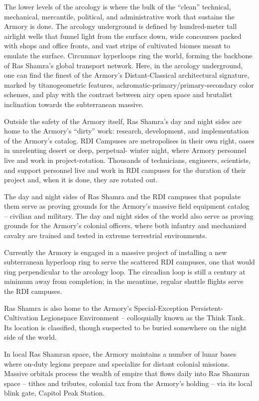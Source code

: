 The lower levels of the arcology is where the bulk of the ``clean'' technical, mechanical, mercantile,
political, and administrative work that sustains the Armory is done. The arcology underground is
defined by hundred-meter tall airlight wells that funnel light from the surface down, wide
concourses packed with shops and office fronts, and vast strips of cultivated biomes meant to
emulate the surface. Circumnav hyperloops ring the world, forming the backbone of Ras
Shamra's global transport network. Here, in the arcology underground, one can find the finest of
the Armory's Distant-Classical architectural signature, marked by titanogeometric features,
achromatic-primary/primary-secondary color schemes, and play with the contrast between airy
open space and brutalist inclination towards the subterranean massive.

Outside the safety of the Armory itself, Ras Shamra's day and night sides are home to the
Armory's ``dirty'' work: research, development, and implementation of the Armory's catalog. RDI
Campuses are metropolises in their own right, oases in unrelenting desert or deep, perpetual-
winter night, where Armory personnel live and work in project-rotation. Thousands of technicians,
engineers, scientists, and support personnel live and work in RDI campuses for the duration of
their project and, when it is done, they are rotated out.

The day and night sides of Ras Shamra and the RDI campuses that populate them serve as
proving grounds for the Armory's massive field equipment catalog -- civilian and military. The day
and night sides of the world also serve as proving grounds for the Armory's colonial officers,
where both infantry and mechanized cavalry are trained and tested in extreme terrestrial
environments.

Currently the Armory is engaged in a massive project of installing a new subterranean hyperloop
ring to serve the scattered RDI campuses, one that would ring perpendicular to the arcology loop.
The circadian loop is still a century at minimum away from completion; in the meantime, regular
shuttle flights serve the RDI campuses.

Ras Shamra is also home to the Armory's Special-Exception Persistent-Cultivation Legionspace
Environment -- colloquially known as the Think Tank. Its location is classified, though suspected to
be buried somewhere on the night side of the world.

In local Ras Shamran space, the Armory maintains a number of lunar bases where on-duty
legions prepare and specialize for distant colonial missions. Massive orbitals process the wealth
of empire that flows daily into Ras Shamran space -- tithes and tributes, colonial tax from the
Armory's holding -- via its local blink gate, Capitol Peak Station.

